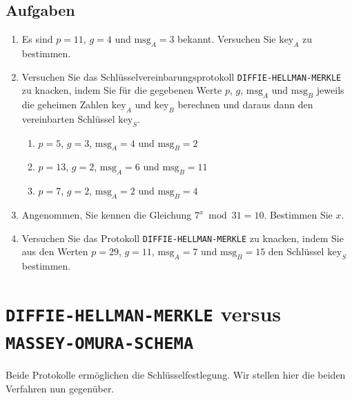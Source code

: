 \subsection{Aufgaben}

\begin{enumerate}
	\item Es sind $p = 11$, $g = 4$ und $\text{msg}_A = 3$ bekannt. Versuchen Sie $\text{key}_A$ zu bestimmen.
	\item Versuchen Sie das Schlüsselvereinbarungsprotokoll \texttt{DIFFIE-HELLMAN-MERKLE} zu knacken, indem Sie für die gegebenen Werte $p$, $g$, $\text{msg}_A$ und $\text{msg}_B$ jeweils die geheimen Zahlen $\text{key}_A$ und $\text{key}_B$ berechnen und daraus dann den vereinbarten Schlüssel $\text{key}_S$.
	\begin{enumerate}
		\item $p = 5$, $g = 3$, $\text{msg}_A = 4$ und $\text{msg}_B = 2$
		\item $p = 13$, $g = 2$, $\text{msg}_A = 6$ und $\text{msg}_B = 11$
		\item $p = 7$, $g = 2$, $\text{msg}_A = 2$ und $\text{msg}_B = 4$
	\end{enumerate}
	\item Angenommen, Sie kennen die Gleichung $7^x \bmod 31 = 10$. Bestimmen Sie $x$.
	\item Versuchen Sie das Protokoll \texttt{DIFFIE-HELLMAN-MERKLE} zu knacken, indem Sie aus den Werten $p = 29$, $g = 11$, $\text{msg}_A = 7$ und $\text{msg}_B = 15$ den Schlüssel $\text{key}_S$ bestimmen.
\end{enumerate}

\section{\texttt{DIFFIE-HELLMAN-MERKLE} versus \texttt{MASSEY-OMURA-SCHEMA}}

Beide Protokolle ermöglichen die Schlüsselfestlegung. Wir stellen hier die beiden Verfahren nun gegenüber.


